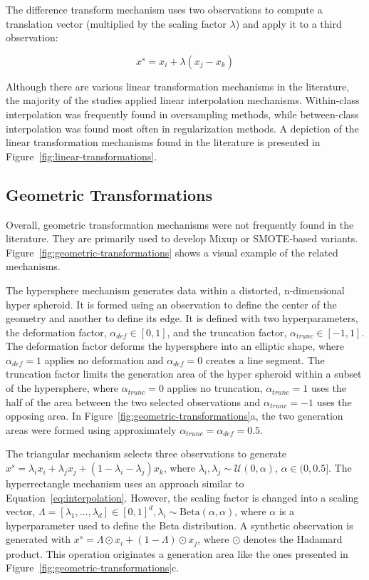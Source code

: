 The difference transform mechanism uses two observations to compute a
translation vector (multiplied by the scaling factor $\lambda$) and apply it
to a third observation:

\begin{equation}
    x^s = x_i + \lambda(x_j - x_k)
\end{equation}

Although there are various linear transformation mechanisms in the literature,
the majority of the studies applied linear interpolation mechanisms.
Within-class interpolation was frequently found in oversampling methods, while
between-class interpolation was found most often in regularization methods. A
depiction of the linear transformation mechanisms found in the literature
is presented in Figure~\ref{fig:linear-transformations}.

\subsection{Geometric Transformations}

Overall, geometric transformation mechanisms were not frequently found in the
literature. They are primarily used to develop Mixup or SMOTE-based variants.
Figure~\ref{fig:geometric-transformations} shows a visual example of the
related mechanisms.

The hypersphere mechanism generates data within a distorted, n-dimensional
hyper spheroid. It is formed using an observation to define the center of
the geometry and another to define its edge.
It is defined with two hyperparameters, the deformation
factor, $\alpha_{def} \in [0, 1]$, and the truncation factor, $\alpha_{trunc}
\in [-1, 1]$. The deformation factor deforms the hypersphere into an elliptic
shape, where $\alpha_{def}=1$ applies no deformation and $\alpha_{def}=0$
creates a line segment. The truncation factor limits the generation area of
the hyper spheroid within a subset of the hypersphere, where $\alpha_{trunc}=0$
applies no truncation, $\alpha_{trunc}=1$ uses the half of the area between
the two selected observations and $\alpha_{trunc}=-1$ uses the opposing area.
In Figure~\ref{fig:geometric-transformations}a, the two generation areas were
formed using approximately $\alpha_{trunc} = \alpha_{def} = 0.5$.

The triangular mechanism selects three observations to generate $x^s =
\lambda_ix_i + \lambda_jx_j + (1-\lambda_i-\lambda_j)x_k$, where $\lambda_i,
\lambda_j \sim \mathcal{U}(0, \alpha)$, $\alpha \in (0, 0.5]$. The
hyperrectangle mechanism uses an approach similar to
Equation~\ref{eq:interpolation}. However, the scaling factor is changed into a
scaling vector, $\Lambda = [\lambda_1,\dots,\lambda_d ] \in [0,1]^d, \lambda_i
\sim \text{Beta}(\alpha, \alpha)$, where $\alpha$ is a hyperparameter used to
define the Beta distribution. A synthetic observation is generated with $x^s =
\Lambda \odot x_i + (1-\Lambda) \odot x_j$, where $\odot$ denotes the Hadamard
product. This operation originates a generation area like the ones presented
in Figure~\ref{fig:geometric-transformations}c.

